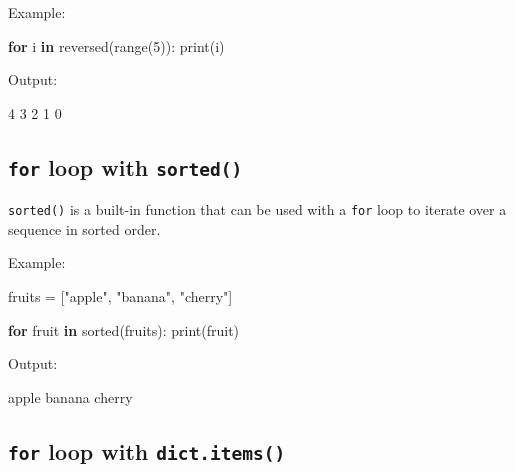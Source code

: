\documentclass[
  paper=a4,
  ,captions=tableheading
]{scrartcl}
\newenvironment{Shaded}{}{}
\newcommand{\BuiltInTok}[1]{\textcolor[rgb]{0.00,0.50,0.00}{#1}}
\newcommand{\ControlFlowTok}[1]{\textcolor[rgb]{0.00,0.44,0.13}{\textbf{#1}}}
\newcommand{\DecValTok}[1]{\textcolor[rgb]{0.25,0.63,0.44}{#1}}
\newcommand{\ExtensionTok}[1]{#1}
\newcommand{\KeywordTok}[1]{\textcolor[rgb]{0.00,0.44,0.13}{\textbf{#1}}}
\newcommand{\NormalTok}[1]{#1}
\newcommand{\OperatorTok}[1]{\textcolor[rgb]{0.40,0.40,0.40}{#1}}
\newcommand{\StringTok}[1]{\textcolor[rgb]{0.25,0.44,0.63}{#1}}
\begin{document}
Example:

\begin{Shaded}
\begin{Highlighting}[]
\ControlFlowTok{for}\NormalTok{ i }\KeywordTok{in} \BuiltInTok{reversed}\NormalTok{(}\BuiltInTok{range}\NormalTok{(}\DecValTok{5}\NormalTok{)):}
    \BuiltInTok{print}\NormalTok{(i)}
\end{Highlighting}
\end{Shaded}

Output:

\begin{Shaded}
\begin{Highlighting}[]
\ExtensionTok{4}
\ExtensionTok{3}
\ExtensionTok{2}
\ExtensionTok{1}
\ExtensionTok{0}
\end{Highlighting}
\end{Shaded}

\hypertarget{for-loop-with-sorted}{%
\subsection{\texorpdfstring{\texttt{for} loop with
\texttt{sorted()}}{for loop with sorted()}}\label{for-loop-with-sorted}}

\texttt{sorted()} is a built-in function that can be used with a
\texttt{for} loop to iterate over a sequence in sorted order.

Example:

\begin{Shaded}
\begin{Highlighting}[]
\NormalTok{fruits }\OperatorTok{=}\NormalTok{ [}\StringTok{"apple"}\NormalTok{, }\StringTok{"banana"}\NormalTok{, }\StringTok{"cherry"}\NormalTok{]}

\ControlFlowTok{for}\NormalTok{ fruit }\KeywordTok{in} \BuiltInTok{sorted}\NormalTok{(fruits):}
    \BuiltInTok{print}\NormalTok{(fruit)}
\end{Highlighting}
\end{Shaded}

Output:

\begin{Shaded}
\begin{Highlighting}[]
\ExtensionTok{apple}
\ExtensionTok{banana}
\ExtensionTok{cherry}
\end{Highlighting}
\end{Shaded}

\hypertarget{for-loop-with-dict.items}{%
\subsection{\texorpdfstring{\texttt{for} loop with
\texttt{dict.items()}}{for loop with dict.items()}}\label{for-loop-with-dict.items}}
\end{document}
